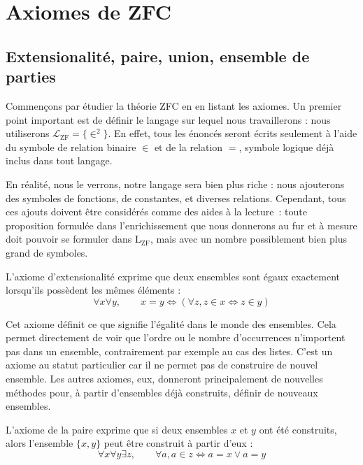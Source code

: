 \section{Axiomes de ZFC}

\subsection[Premiers axiomes]{Extensionalité, paire, union, ensemble de parties}

Commençons par étudier la théorie ZFC en en listant les axiomes. Un premier
point important est de définir le langage sur lequel nous travaillerons : nous
utiliserons $\mathcal L_{\mathrm{ZF}} = \{ \in^2\}$. En effet, tous les énoncés
seront écrits seulement à l'aide du symbole de relation binaire $\in$ et de la
relation $=$, symbole logique déjà inclus dans tout langage.

\begin{remark}
  En réalité, nous le verrons, notre langage sera bien plus riche : nous
  ajouterons des symboles de fonctions, de constantes, et diverses relations.
  Cependant, tous ces ajouts doivent être considérés comme des aides à la
  lecture~: toute proposition formulée dans l'enrichissement que nous donnerons
  au fur et à mesure doit pouvoir se formuler dans $\mathrm L_{\mathrm{ZF}}$, mais
  avec un nombre possiblement bien plus grand de symboles.
\end{remark}

\begin{axiom}[Extensionalité]\label{ax.ZF.ext}
  L'axiome d'extensionalité exprime que deux ensembles sont égaux exactement
  lorsqu'ils possèdent les mêmes éléments :
  \[\forall x \forall y, \qquad x = y \iff (\forall z, z \in x\iff z \in y)\]
\end{axiom}

Cet axiome définit ce que signifie l'égalité dans le monde des ensembles. Cela
permet directement de voir que l'ordre ou le nombre d'occurrences n'importent
pas dans un ensemble, contrairement par exemple au cas des listes. C'est un
axiome au statut particulier car il ne permet pas de construire de nouvel
ensemble. Les autres axiomes, eux, donneront principalement de nouvelles
méthodes pour, à partir d'ensembles déjà construits, définir de nouveaux
ensembles.

\begin{axiom}[Paire]\label{ax.ZF.pair}
  L'axiome de la paire exprime que si deux ensembles $x$ et $y$ ont été
  construits, alors l'ensemble $\{x,y\}$ peut être construit à partir d'eux :
  \[\forall x \forall y \exists z, \qquad \forall a, a \in z \iff
  a = x \lor a = y\]
\end{axiom}

